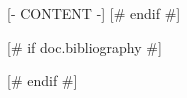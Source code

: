\documentclass[letterpaper,11pt]{article}
[# else #]
\begin{document}
\hypersetup{pageanchor=true}
\tableofcontents

\mainmatter

[- CONTENT -]
[# endif #]

[# if doc.bibliography #]

[# endif #]
\end{document}
